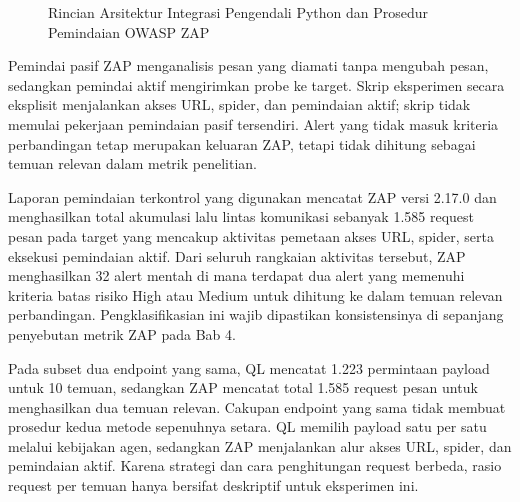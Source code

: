 \begin{figure}[H]
{
} %
\caption{Rincian Arsitektur Integrasi Pengendali Python dan Prosedur Pemindaian OWASP ZAP}
\label{fig:zap_architecture_flow}
\end{figure}



Pemindai pasif ZAP menganalisis pesan yang diamati tanpa mengubah pesan, sedangkan pemindai aktif mengirimkan probe ke target. Skrip eksperimen secara eksplisit menjalankan akses URL, spider, dan pemindaian aktif; skrip tidak memulai pekerjaan pemindaian pasif tersendiri. Alert yang tidak masuk kriteria perbandingan tetap merupakan keluaran ZAP, tetapi tidak dihitung sebagai temuan relevan dalam metrik penelitian.

Laporan pemindaian terkontrol yang digunakan mencatat ZAP versi 2.17.0 dan menghasilkan total akumulasi lalu lintas komunikasi sebanyak 1.585 request pesan pada target yang mencakup aktivitas pemetaan akses URL, spider, serta eksekusi pemindaian aktif. Dari seluruh rangkaian aktivitas tersebut, ZAP menghasilkan 32 alert mentah di mana terdapat dua alert yang memenuhi kriteria batas risiko High atau Medium untuk dihitung ke dalam temuan relevan perbandingan. Pengklasifikasian ini wajib dipastikan konsistensinya di sepanjang penyebutan metrik ZAP pada Bab 4.

Pada subset dua endpoint yang sama, QL mencatat 1.223 permintaan payload untuk 10 temuan, sedangkan ZAP mencatat total 1.585 request pesan untuk menghasilkan dua temuan relevan. Cakupan endpoint yang sama tidak membuat prosedur kedua metode sepenuhnya setara. QL memilih payload satu per satu melalui kebijakan agen, sedangkan ZAP menjalankan alur akses URL, spider, dan pemindaian aktif. Karena strategi dan cara penghitungan request berbeda, rasio request per temuan hanya bersifat deskriptif untuk eksperimen ini.

